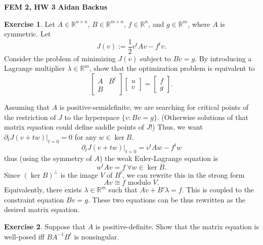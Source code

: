 \documentclass[10pt]{article}
\newcommand{\RR}{\mathbb{R}}
\theoremstyle{definition}
\newtheorem{exer}{Exercise}
\begin{document}
\noindent
\large\textbf{FEM 2, HW 3} \hfill \textbf{Aidan Backus} \\

\begin{exer}
    Let $A \in \RR^{n \times n}$, $B \in \RR^{m \times n}$, $f \in \RR^n$, and $g \in \RR^m$, where $A$ is symmetric.
    Let
    $$J(v) := \frac{1}{2} v^tAv - f^tv.$$
    Consider the problem of minimizing $J(v)$ subject to $Bv = g$.
    By introducing a Lagrange multiplier $\lambda \in \RR^m$, show that the optimization problem is equivalent to
    $$\begin{bmatrix}A & B^t \\ B\end{bmatrix} \begin{bmatrix}u \\ v \end{bmatrix} = \begin{bmatrix}f \\ g\end{bmatrix}.$$
\end{exer}

Assuming that $A$ is positive-semidefinite, we are searching for critical points of the restriction of $J$ to the hyperspace $\{v: Bv = g\}$.
(Otherwise solutions of that matrix equation could define saddle points of $J$!)
Thus, we want $\partial_t J(v + tw)|_{t = 0} = 0$ for any $w \in \ker B$.
$$\partial_t J(v + tw)|_{t = 0} = v^t Aw - f^t w$$
thus (using the symmetry of $A$) the weak Euler-Lagrange equation is
$$w^t Av = f ~\forall w \in \ker B.$$
Since $(\ker B)^\perp$ is the image $V$ of $B^t$, we can rewrite this in the strong form
$$Av \cong f \text{ modulo } V.$$
Equivalently, there exists $\lambda \in \RR^m$ such that $Av + B'\lambda = f$.
This is coupled to the constraint equation $Bv = g$.
These two equations can be thus rewritten as the desired matrix equation.

\begin{exer}
    Suppose that $A$ is positive-definite.
    Show that the matrix equation is well-posed iff $BA^{-1}B^t$ is nonsingular.
\end{exer}
\end{document}
